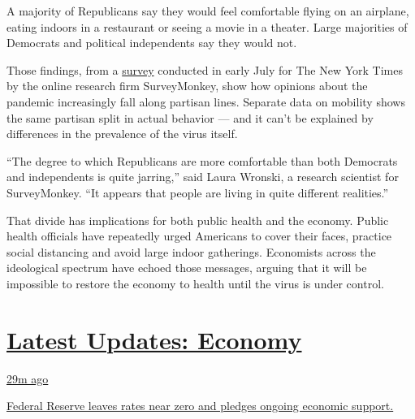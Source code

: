A majority of Republicans say they would feel comfortable flying on an
airplane, eating indoors in a restaurant or seeing a movie in a theater.
Large majorities of Democrats and political independents say they would
not.

Those findings, from a
\href{https://www.surveymonkey.com/curiosity/nyt-july-2020-cci/}{survey}
conducted in early July for The New York Times by the online research
firm SurveyMonkey, show how opinions about the pandemic increasingly
fall along partisan lines. Separate data on mobility shows the same
partisan split in actual behavior --- and it can't be explained by
differences in the prevalence of the virus itself.

``The degree to which Republicans are more comfortable than both
Democrats and independents is quite jarring,'' said Laura Wronski, a
research scientist for SurveyMonkey. ``It appears that people are living
in quite different realities.''

That divide has implications for both public health and the economy.
Public health officials have repeatedly urged Americans to cover their
faces, practice social distancing and avoid large indoor gatherings.
Economists across the ideological spectrum have echoed those messages,
arguing that it will be impossible to restore the economy to health
until the virus is under control.

\hypertarget{latest-updates-economy}{%
\section{\texorpdfstring{\href{https://www.nytimes.com/live/2020/07/29/business/stock-market-today-coronavirus?action=click\&pgtype=Article\&state=default\&region=MAIN_CONTENT_1\&context=storylines_live_updates}{Latest
Updates:
Economy}}{Latest Updates: Economy}}\label{latest-updates-economy}}

\href{https://www.nytimes.com/live/2020/07/29/business/stock-market-today-coronavirus?action=click\&pgtype=Article\&state=default\&region=MAIN_CONTENT_1\&context=storylines_live_updates\#federal-reserve-leaves-rates-near-zero-and-pledges-ongoing-economic-support}{29m
ago}

\href{https://www.nytimes.com/live/2020/07/29/business/stock-market-today-coronavirus?action=click\&pgtype=Article\&state=default\&region=MAIN_CONTENT_1\&context=storylines_live_updates\#federal-reserve-leaves-rates-near-zero-and-pledges-ongoing-economic-support}{Federal
Reserve leaves rates near zero and pledges ongoing economic support.}


